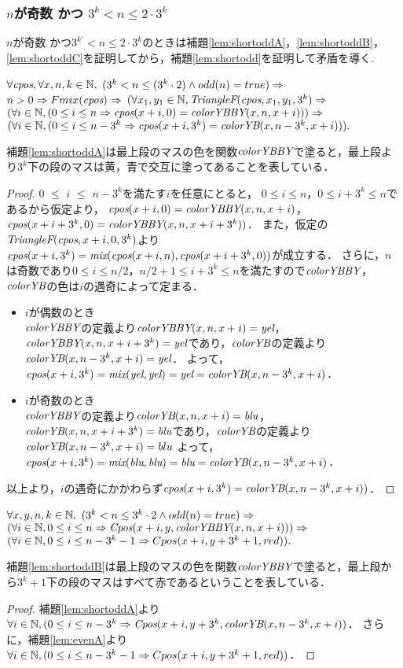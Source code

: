\subsubsection{$n$が奇数 かつ $3^{k} < n \leq 2 \cdot 3^{k}$}
$n$が奇数 かつ$3^{k'} < n \leq 2 \cdot 3^{k}$のときは補題\ref{lem:shortoddA}，\ref{lem:shortoddB}，\ref{lem:shortoddC}を証明してから，補題\ref{lem:shortodd}を証明して矛盾を導く.
\begin{lem}[\ShortOddA] \label{lem:shortoddA}
  $\forall \textit{cpos}, \forall x, n, k \in \mathbb{N},$
  $(3^k < n \leq (3^k\cdot2) \land odd(n) = true) \Rightarrow$
  $n > 0  \Rightarrow Fmix(\textit{cpos}) \Rightarrow $
  $(\forall x_1, y_1 \in \mathbb{N}, \textit{TriangleF}(\textit{cpos},x_1,y_1,3^k) \Rightarrow$
  $(\forall i \in \mathbb{N}, (0 \leq i \leq n \Rightarrow \textit{cpos}(x+i,0) = \textit{colorYBBY}(x,n,x+i))) \Rightarrow$
  $(\forall i \in \mathbb{N}, (0 \leq i \leq n - 3^k \Rightarrow \textit{cpos}(x+i,3^k) = \textit{colorYB}(x,n-3^k,x+i))).$
\end{lem}
補題\ref{lem:shortoddA}は最上段のマスの色を関数$\textit{colorYBBY}$で塗ると，最上段より$3^k$下の段のマスは黄，青で交互に塗ってあることを表している．
\begin{proof}
  $0$ $\leq$ $i$ $\leq$ $n-3^k$を満たす$i$を任意にとると，
  $0 \leq i \leq n$，$0 \leq i+3^k \leq n$であるから仮定より，
  $\textit{cpos}(x+i,0) = \textit{colorYBBY}(x,n,x+i)$，
  $\textit{cpos}(x+i+3^k,0) = \textit{colorYBBY}(x,n,x+i+3^k))$．
  また，仮定の$\textit{TriangleF}(\textit{cpos},x+i,0,3^k)$より
  $\textit{cpos}(x+i,3^k)=\textit{mix}(\textit{cpos}(x+i,n),\textit{cpos}(x+i+3^k,0))$が成立する．
  さらに，$n$は奇数であり$0 \leq i \leq n/2$，$n/2+1 \leq i+3^k \leq n$を満たすので$\textit{colorYBBY}$，$\textit{colorYB}$の色は$i$の遇奇によって定まる．
  \begin{itemize}
  \item
    $i$が偶数のとき \\
    $\textit{colorYBBY}$の定義より$\textit{colorYBBY}(x,n,x+i)=\textit{yel}$，$\textit{colorYBBY}(x,n,x+i+3^k)=\textit{yel}$であり，$\textit{colorYB}$の定義より$\textit{colorYB}(x,n-3^k,x+i)=\textit{yel}$．
    よって，$\textit{cpos}(x+i,3^k)=\textit{mix}(\textit{yel},\textit{yel})=\textit{yel}=\textit{colorYB}(x,n-3^k,x+i)$．
  \item
    $i$が奇数のとき \\
    $\textit{colorYBBY}$の定義より$\textit{colorYB}(x,n,x+i)=\textit{blu}$，$\textit{colorYB}(x,n,x+i+3^k)=\textit{blu}$であり，$\textit{colorYB}$の定義より$\textit{colorYB}(x,n-3^k,x+i)=blu$
    よって，$\textit{cpos}(x+i,3^k)=\textit{mix}(\textit{blu},\textit{blu})=\textit{blu}=\textit{colorYB}(x,n-3^k,x+i)$．
  \end{itemize}
  以上より，$i$の遇奇にかかわらず$\textit{cpos}(x+i,3^k) = \textit{colorYB}(x,n-3^k,x+i))$．
\end{proof}
%
%
\begin{lem}[\ShortOddB] \label{lem:shortoddB}
  $\forall x,y,n,k \in \mathbb{N},$
  $(3^k < n \leq 3^k\cdot2 \land odd(n) = true) \Rightarrow$
  $(\forall i \in \mathbb{N}, 0 \leq i \leq n \Rightarrow \textit{Cpos}(x+i,y,\textit{colorYBBY}(x,n,x+i))) \Rightarrow$
  $(\forall i \in \mathbb{N}, 0 \leq i \leq n - 3^k-1 \Rightarrow Cpos(x+i,y+3^k+1,red)).$
\end{lem}
補題\ref{lem:shortoddB}は最上段のマスの色を関数$\textit{colorYBBY}$で塗ると，最上段から$3^k+1$下の段のマスはすべて赤であるということを表している．
\begin{proof}
  補題\ref{lem:shortoddA}より$\forall i \in \mathbb{N},(0 \leq i \leq n - 3^k \Rightarrow \textit{Cpos}(x+i,y+3^k,\textit{colorYB}(x,n-3^k,x+i))$．
  さらに，補題\ref{lem:evenA}より$\forall i \in \mathbb{N}, (0 \leq i \leq n - 3^k-1 \Rightarrow Cpos(x+i,y+3^k+1,red))$．
\end{proof}

